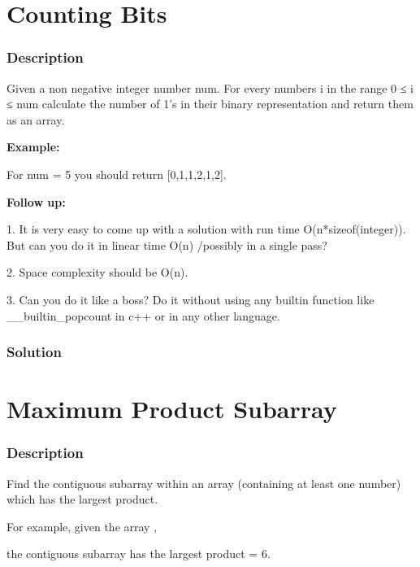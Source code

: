 \newpage

\section{Counting Bits} %

\subsubsection{Description}
Given a non negative integer number num. For every numbers i in the range 0 ≤ i ≤ num calculate the number of 1's in their binary representation and return them as an array.

\textbf{Example:}

For num = 5 you should return [0,1,1,2,1,2].

\textbf{Follow up:}

1. It is very easy to come up with a solution with run time O(n*sizeof(integer)). But can you do it in linear time O(n) /possibly in a single pass?

2. Space complexity should be O(n).

3. Can you do it like a boss? Do it without using any builtin function like __builtin_popcount in c++ or in any other language.

\subsubsection{Solution}

\begin{Code}

\end{Code}

\newpage

\section{Maximum Product Subarray} %

\subsubsection{Description}
Find the contiguous subarray within an array (containing at least one number) which has the largest product.

For example, given the array \code{[2,3,-2,4]},

the contiguous subarray \code{[2,3]} has the largest product = 6.

